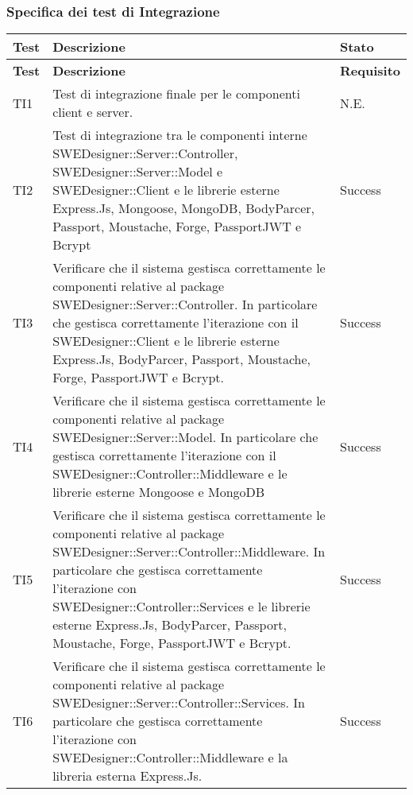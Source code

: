 \subsubsection{Specifica dei test di Integrazione}
\begin{longtable}{p{2cm}!{\VRule[1pt]}p{9.5cm}!{\VRule[1pt]}p{1.5cm}}
\color{white} \textbf{Test} & \color{white} \textbf{Descrizione}  & \color{white} \textbf{Stato}\\ 
\endfirsthead 
{} 
\color{white} \textbf{Test} & \color{white} \textbf{Descrizione}  & \color{white} \textbf{Requisito}\\  
\endhead 
TI1 & Test di integrazione finale per le componenti client e server. & N.E.\\

TI2 & Test di integrazione tra le componenti interne SWEDesigner::Server::Controller, SWEDesigner::Server::Model e SWEDesigner::Client e le librerie esterne Express.Js, Mongoose, MongoDB, BodyParcer, Passport, Moustache, Forge, PassportJWT e Bcrypt & Success\\

TI3 & Verificare che il sistema gestisca correttamente le componenti relative al package SWEDesigner::Server::Controller. In particolare che gestisca correttamente l'iterazione con il SWEDesigner::Client e le librerie esterne Express.Js, BodyParcer, Passport, Moustache, Forge, PassportJWT e Bcrypt. & Success\\

TI4 & Verificare che il sistema gestisca correttamente le componenti relative al package SWEDesigner::Server::Model. In particolare che gestisca correttamente l'iterazione con il SWEDesigner::Controller::Middleware e le librerie esterne Mongoose e MongoDB  & Success\\

TI5 & Verificare che il sistema gestisca correttamente le componenti relative al package SWEDesigner::Server::Controller::Middleware. In particolare che gestisca correttamente l'iterazione con SWEDesigner::Controller::Services e le librerie esterne Express.Js, BodyParcer, Passport, Moustache, Forge, PassportJWT e Bcrypt. & Success\\

TI6 & Verificare che il sistema gestisca correttamente le componenti relative al package SWEDesigner::Server::Controller::Services. In particolare che gestisca correttamente l'iterazione con SWEDesigner::Controller::Middleware e la libreria esterna Express.Js. & Success\\


\end{longtable}
